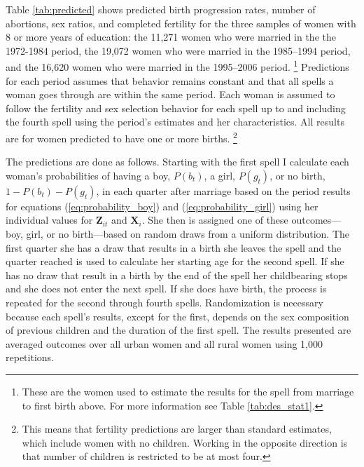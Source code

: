 \documentclass[12pt,letterpaper]{article}
\begin{document}
% 
% 
% 

Table \ref{tab:predicted} shows predicted birth progression rates, number of abortions, 
sex ratios, and completed fertility for the three samples of women with 8 or more years 
of education:  
the 11,271 women who were married in the the 1972-1984 period,
the 19,072 women who were married in the 1985--1994 period,
and the 16,620 women who were married in the 1995--2006 period.%
\footnote{
These are the women used to estimate the results for the spell from marriage to first 
birth above.
For more information see Table \ref{tab:des_stat1}.
}
Predictions for each period assumes that behavior remains constant and that all spells 
a woman goes through are within the same period. 
Each woman is assumed to follow the fertility and sex selection behavior for 
each spell up to and including the fourth spell using the period's estimates and her 
characteristics. 
All results are for women predicted to have one or more births.%
\footnote{
This means that fertility predictions are larger than standard estimates, which include
women with no children.
Working in the opposite direction is that number of children is restricted to be at most 
four.
}

The predictions are done as follows.
Starting with the first spell I calculate each woman's probabilities of having a boy,
$P(b_t)$, a girl, $P(g_t)$, or no birth, $1-P(b_t)-P(g_t)$, in each quarter after marriage
based on the period results for 
equations (\ref{eq:probability_boy}) and (\ref{eq:probability_girl}) using her individual 
values for $\mathbf{Z}_{it}$ and $\mathbf{X}_{i}$.
She then is assigned one of these outcomes---boy, girl, or no birth---based on random 
draws from a uniform distribution.
The first quarter she has a draw that results in a birth she leaves the spell
and the quarter reached is used to calculate her starting age for the second spell.
If she has no draw that result in a birth by the end of the spell her childbearing 
stops and she does not enter the next spell.
If she does have birth, the process is repeated for the second through fourth spells.
Randomization is necessary because each spell's results, except for the first, depends on
the sex composition of previous children and the duration of the first spell. 
The results presented are averaged outcomes over all urban women and all rural women 
using 1,000 repetitions.
\end{document}
